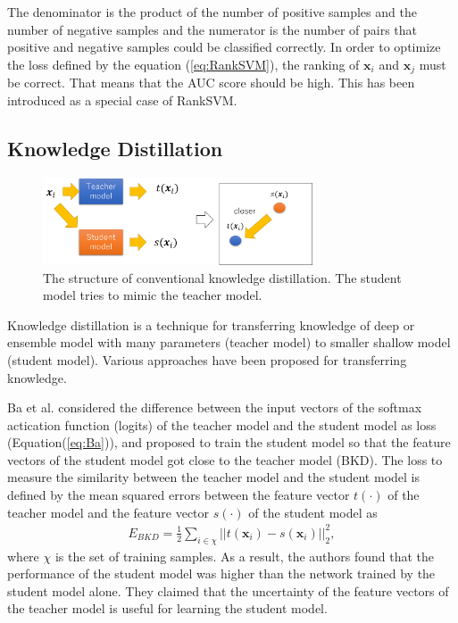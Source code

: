 \documentclass[a4paper,12pt]{article}
\begin{document}
The denominator is the product of the number of positive samples and the number of negative samples and the numerator is the number of pairs that positive and negative samples could be classified correctly.
In order to optimize the loss defined by the equation (\ref{eq:RankSVM}), the ranking of ${\bm x_i}$ and ${\bm x_j}$ must be correct.
That means that the AUC score should be high. 
This has been introduced as a special case of RankSVM.
\clearpage
\subsection{Knowledge Distillation}
\begin{figure}[ht]
\begin{center}
\includegraphics[width=80mm]{figure_KD.png}
\caption{The structure of conventional knowledge distillation. The student model tries to mimic the teacher model.}
\label{fig:KD}
\end{center}
\end{figure}
Knowledge distillation is a technique for transferring knowledge of deep or ensemble model with many parameters (teacher model) to smaller shallow model (student model).
Various approaches have been proposed for transferring knowledge.

Ba et al. \cite{Ba2014} considered the difference between the input vectors of the softmax actication function (logits) of the teacher model and the student model as loss (Equation(\ref{eq:Ba})), and proposed to train the student model so that the feature vectors of the student model got close to the teacher model (BKD).
The loss to measure the similarity between the teacher model and the student model is defined by the mean squared errors between the feature vector $t(\cdot)$ of the teacher model and the feature vector $s(\cdot)$ of the student model as 
\begin{align} \label{eq:Ba}
E_{BKD}= \frac{1}{2}\sum_{i \in \chi} ||t(\bm{x}_i) - s(\bm{x}_i)||^2_2,
\end{align}
where $\chi$ is the set of training samples.
As a result, the authors found that the performance of the student model was higher than the network trained by the student model alone.
They claimed that the uncertainty of the feature vectors of the teacher model is useful for learning the student model.
\end{document}
